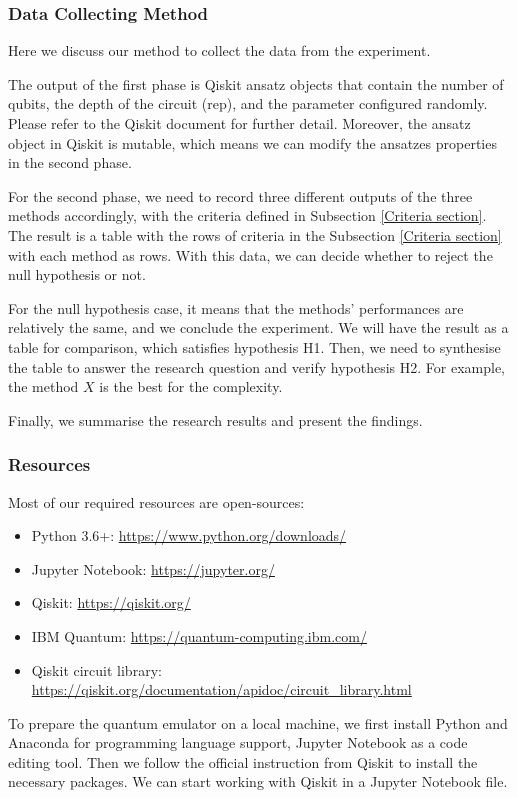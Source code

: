 \subsubsection{Data Collecting Method}
\label{Data Collecting Section}
Here we discuss our method to collect the data from the experiment.

The output of the first phase is Qiskit ansatz objects that contain the number of qubits, the depth of the circuit (rep), and the parameter configured randomly. Please refer to the Qiskit document for further detail.
Moreover, the ansatz object in Qiskit is mutable, which means we can modify the ansatzes properties in the second phase.

For the second phase, we need to record three different outputs of the three methods accordingly, with the criteria defined in Subsection \ref{Criteria section}.
The result is a table with the rows of criteria in the Subsection \ref{Criteria section} with each method as rows.
With this data, we can decide whether to reject the null hypothesis or not.

For the null hypothesis case, it means that the methods' performances are relatively the same, and we conclude the experiment.
We will have the result as a table for comparison, which satisfies hypothesis H1.
Then, we need to synthesise the table to answer the research question and verify hypothesis H2.
For example, the method $X$ is the best for the complexity.

Finally, we summarise the research results and present the findings.

\subsubsection{Resources}
Most of our required resources are open-sources:
\begin{itemize}
    \item Python 3.6+: \url{https://www.python.org/downloads/}
    \item Jupyter Notebook: \url{https://jupyter.org/}
    \item Qiskit: \url{https://qiskit.org/}
    \item IBM Quantum: \url{https://quantum-computing.ibm.com/}
    \item Qiskit circuit library: \url{https://qiskit.org/documentation/apidoc/circuit_library.html}
\end{itemize}

To prepare the quantum emulator on a local machine, we first install Python and Anaconda for programming language support, Jupyter Notebook as a code editing tool.
Then we follow the official instruction from Qiskit \cite{Qiskit} to install the necessary packages.
We can start working with Qiskit in a Jupyter Notebook file.

